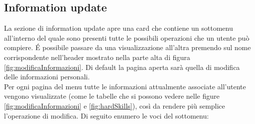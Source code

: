\subsection{Information update}
La sezione di information update apre una card che contiene un sottomenu all'interno del quale sono presenti tutte le possibili operazioni che un utente può compiere. \'E possibile passare da una visualizzazione all'altra premendo sul nome corrispondente nell'header mostrato nella parte alta di figura \ref{fig:modificaInformazioni}. Di default la pagina aperta sarà quella di modifica delle informazioni personali.
\\
Per ogni pagina del menu tutte le informazioni attualmente associate all'utente vengono visualizzate (come le tabelle che si possono vedere nelle figure \ref{fig:modificaInformazioni} e \ref{fig:hardSkills}), così da rendere più semplice l'operazione di modifica. Di seguito enumero le voci del sottomenu:
